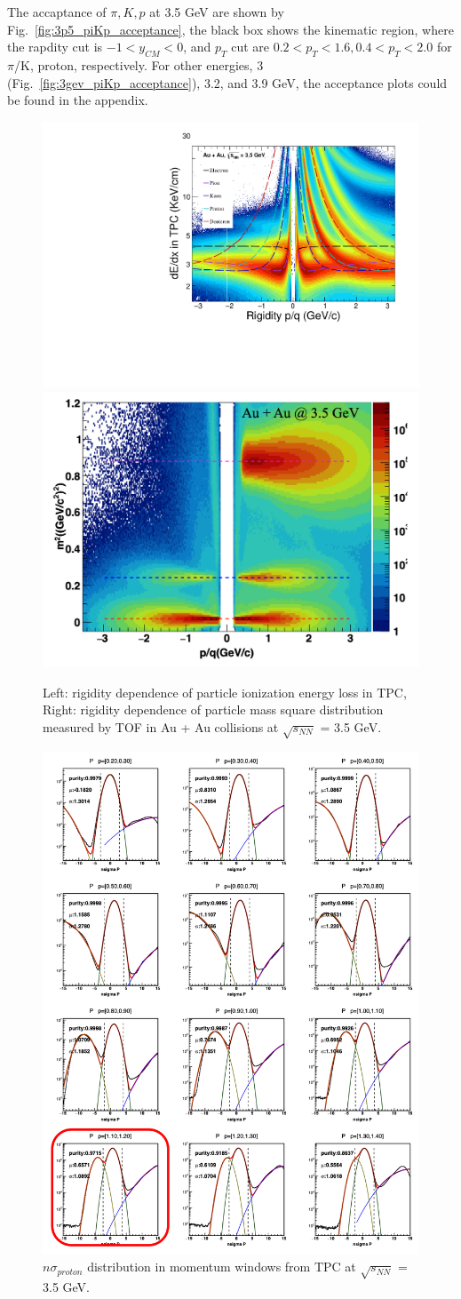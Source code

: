 The accaptance of $\pi, K, p$ at 3.5 GeV are shown by Fig.~\ref{fig:3p5_piKp_acceptance}, the black box shows the kinematic region, where the rapdity cut is $-1<y_{CM}<0$, 
and $p_T$ cut are $0.2<p_T<1.6, 0.4<p_T<2.0$ for $\pi$/K, proton, respectively. For other energies, 3 (Fig.~\ref{fig:3gev_piKp_acceptance}), 3.2, and 3.9 GeV, the acceptance plots could be found in the appendix. 

\begin{figure}[hbt!]
\centering
\includegraphics[width=0.35\linewidth]{figures/chapter02/3p5GeV_dEdx_P23id.pdf}
\includegraphics[width=0.35\linewidth]{figures/chapter02/m2_3p5gev.png}
\caption{Left: rigidity dependence of particle ionization energy loss in TPC, Right: rigidity dependence of particle mass square distribution measured by TOF in Au + Au collisions at $\sqrt{s_{NN}}$ = 3.5 GeV.}
\label{fig:dedx_m2}
\end{figure}

\begin{figure}[hbt!]
\centering
\includegraphics[width=0.55\linewidth]{figures/chapter02/nsigmaproton_3p5gev.png}
\caption{$n\sigma_{proton}$ distribution in momentum windows from TPC at $\sqrt{s_{NN}}$ = 3.5 GeV.}
\label{fig:nsigmaproton_3p5}
\end{figure}

